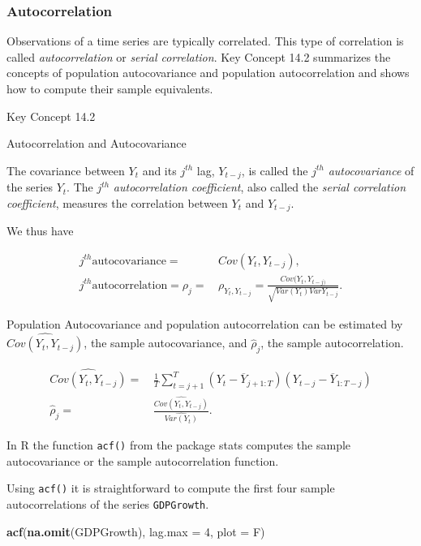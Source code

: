 \documentclass[]{book}
\newenvironment{Shaded}{\begin{snugshade}}{\end{snugshade}}
\newcommand{\KeywordTok}[1]{\textcolor[rgb]{0.13,0.29,0.53}{\textbf{#1}}}
\newcommand{\DataTypeTok}[1]{\textcolor[rgb]{0.13,0.29,0.53}{#1}}
\newcommand{\DecValTok}[1]{\textcolor[rgb]{0.00,0.00,0.81}{#1}}
\newcommand{\NormalTok}[1]{#1}
\theoremstyle{definition}
\theoremstyle{definition}
\theoremstyle{definition}
\theoremstyle{remark}
\begin{document}
\subsubsection*{Autocorrelation}\label{autocorrelation}

Observations of a time series are typically correlated. This type of
correlation is called \emph{autocorrelation} or \emph{serial
correlation}. Key Concept 14.2 summarizes the concepts of population
autocovariance and population autocorrelation and shows how to compute
their sample equivalents.

Key Concept 14.2

Autocorrelation and Autocovariance

The covariance between \(Y_t\) and its \(j^{th}\) lag, \(Y_{t-j}\), is
called the \(j^{th}\) \emph{autocovariance} of the series \(Y_t\). The
\(j^{th}\) \emph{autocorrelation coefficient}, also called the
\emph{serial correlation coefficient}, measures the correlation between
\(Y_t\) and \(Y_{t-j}\).

We thus have

\begin{align*}
  j^{th} \text{autocovariance} =& \, Cov(Y_t,Y_{t-j}), \\
  j^{th} \text{autocorrelation} = \rho_j =& \, \rho_{Y_t,Y_{t-j}} = \frac{Cov(Y_t,Y_{t-j)}}{\sqrt{Var(Y_t)Var{Y_{t-j}}}}.
\end{align*}

Population Autocovariance and population autocorrelation can be
estimated by \(\widehat{Cov(Y_t,Y_{t-j})}\), the sample autocovariance,
and \(\widehat{\rho}_j\), the sample autocorrelation.

\begin{align*}
  \widehat{Cov(Y_t,Y_{t-j})} =& \, \frac{1}{T} \sum_{t=j+1}^T (Y_t - \overline{Y}_{j+1:T})(Y_{t-j} - \overline{Y}_{1:T-j}) \\
  \widehat{\rho}_j =& \, \frac{\widehat{Cov(Y_t,Y_{t-j})}}{\widehat{Var(Y_t)}}.
\end{align*}

In R the function \texttt{acf()} from the package stats computes the
sample autocovariance or the sample autocorrelation function.

Using \texttt{acf()} it is straightforward to compute the first four
sample autocorrelations of the series \texttt{GDPGrowth}.

\begin{Shaded}
\begin{Highlighting}[]
\KeywordTok{acf}\NormalTok{(}\KeywordTok{na.omit}\NormalTok{(GDPGrowth), }\DataTypeTok{lag.max =} \DecValTok{4}\NormalTok{, }\DataTypeTok{plot =}\NormalTok{ F)}
\end{Highlighting}
\end{Shaded}
\end{document}
